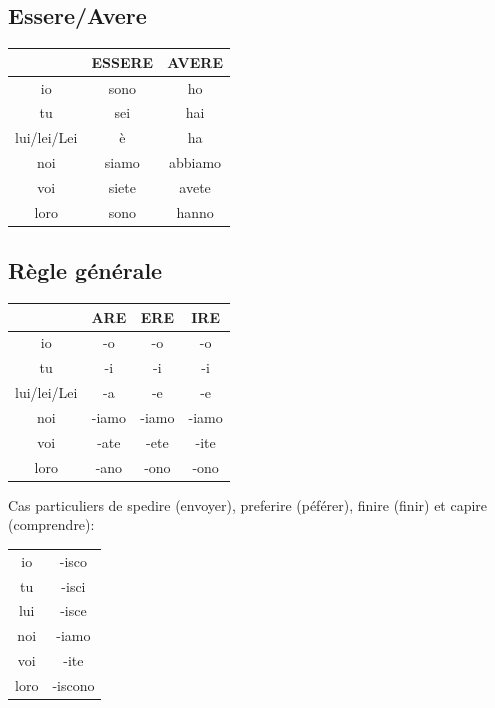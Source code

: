 \documentclass[12pt, openany]{report}
\begin{document}
\subsection{Essere/Avere}
\begin{center}
    \begin{tabular}{c|c|c}
        & ESSERE & AVERE \\ \hline
        io & sono & ho\\
        tu & sei & hai\\
        lui/lei/Lei & è & ha\\ 
        noi & siamo & abbiamo \\
        voi & siete & avete \\
        loro & sono & hanno\\
    \end{tabular}
\end{center}
\subsection{Règle générale}
\begin{minipage}{.49\textwidth}
    \vspace{.75cm}
    \begin{center}
        \begin{tabular}{c||c|c|c}
            & ARE & ERE & IRE\\
            \hline
            io & -o & -o & -o\\
            tu & -i & -i & -i\\
            lui/lei/Lei & -a & -e & -e\\
            noi & -iamo & -iamo & -iamo\\
            voi & -ate & -ete & -ite\\
            loro & -ano & -ono & -ono\\
        \end{tabular}
    \end{center}
\end{minipage}
\begin{minipage}{.45\textwidth}
    Cas particuliers de spedire (envoyer), preferire (péférer), finire (finir) et capire (comprendre):
    \begin{center}
        \begin{tabular}{c||c}
            io & -isco \\
            tu & -isci \\
            lui & -isce \\
            noi & -iamo \\
            voi & -ite \\
            loro & -iscono \\
        \end{tabular}
    \end{center}
\end{minipage}
\end{document}
